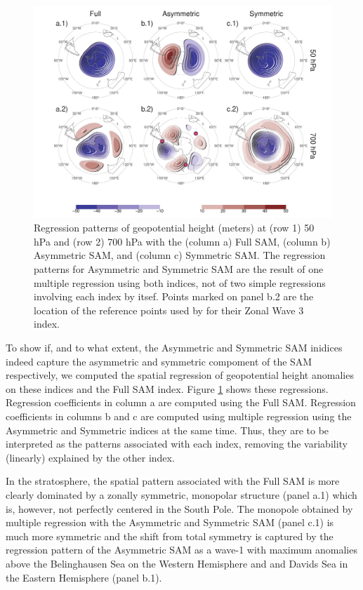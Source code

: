 \documentclass[]{ametsocV5}
\begin{document}
\begin{figure}
\includegraphics{2d-regr-1} \caption[Regression patterns of geopotential height (meters) at (row 1) 50 hPa and (row 2) 700 hPa with the (column a) Full SAM, (column b) Asymmetric SAM, and (column c) Symmetric SAM]{Regression patterns of geopotential height (meters) at (row 1) 50 hPa and (row 2) 700 hPa with the (column a) Full SAM, (column b) Asymmetric SAM, and (column c) Symmetric SAM. The regression patterns for Asymmetric and Symmetric SAM are the result of one multiple regression using both indices, not of two simple regressions involving each index by itsef. Points marked on panel b.2 are the location of the reference points used by \cite{raphael2004} for their Zonal Wave 3 index. }\label{fig:2d-regr}
\end{figure}

To show if, and to what extent, the Asymmetric and Symmetric SAM
inidices indeed capture the asymmetric and symmetric compoment of the
SAM respectively, we computed the spatial regression of geopotential
height anomalies on these indices and the Full SAM index. Figure
\ref{fig:2d-regr} shows these regressions. Regression coefficients in
column a are computed using the Full SAM. Regression coefficients in
columns b and c are computed using multiple regression using the
Asymmetric and Symmetric indices at the same time. Thus, they are to be
interpreted as the patterns associated with each index, removing the
variability (linearly) explained by the other index.

In the stratosphere, the spatial pattern associated with the Full SAM is
more clearly dominated by a zonally symmetric, monopolar structure
(panel a.1) which is, however, not perfectly centered in the South Pole.
The monopole obtained by multiple regression with the Asymmetric and
Symmetric SAM (panel c.1) is much more symmetric and the shift from
total symmetry is captured by the regression pattern of the Asymmetric
SAM as a wave-1 with maximum anomalies above the Belinghausen Sea on the
Western Hemisphere and and Davids Sea in the Eastern Hemisphere (panel
b.1).
\end{document}
